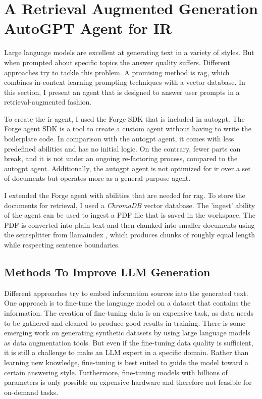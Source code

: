 \documentclass[../main.tex]{subfiles}
\begin{document}
\chapter{A Retrieval Augmented Generation AutoGPT Agent for IR}
\label{ch:agent}

Large language models are excellent at generating text in a variety of styles.
But when prompted about specific topics the answer quality suffers.
Different approaches try to tackle this problem.
A promising method is \gls{rag}, which combines in-context learning prompting techniques with a vector database.
In this section, I present an agent that is designed to answer user prompts in a retrieval-augmented fashion.

To create the \gls{ir} agent,
I used the Forge SDK \autocite{zotero-117} that is included in \gls{autogpt}.
The Forge agent SDK is a tool to create a custom agent without having to write the boilerplate code.
In comparison with the \gls{autogpt} agent, it comes with less predefined abilities and has no initial logic.
On the contrary, fewer parts can break, and it is not under an ongoing re-factoring process,
compared to the \gls{autogpt} agent.
Additionally, the \gls{autogpt} agent is not optimized for \gls{ir} over a set of documents
but operates more as a general-purpose agent.

I extended the Forge agent with abilities that are needed for \gls{rag}.
To store the documents for retrieval, I used a \emph{ChromaDB} vector database.
The 'ingest' ability of the agent can be used to ingest a PDF file that is saved in the workspace.
The PDF is converted into plain text and then chunked into smaller documents using the \gls{sentsplitter} from \gls{llamaindex} \cite{zotero-255},
which produces chunks of roughly equal length while respecting sentence boundaries.

\section{Methods To Improve LLM Generation}

Different approaches try to embed information sources into the generated text.
One approach is to fine-tune the language model on a dataset that contains the information.
The creation of fine-tuning data is an expensive task, as data needs to be gathered and cleaned to produce good results in training.
There is some emerging work on generating synthetic datasets by using large language models as data augmentation tools.
But even if the fine-tuning data quality is sufficient, it is still a challenge to make an LLM expert in a specific domain.
Rather than learning new knowledge, fine-tuning is best suited to guide the model toward a certain answering style.
Furthermore, fine-tuning models with billions of parameters is only possible on expensive hardware and therefore not feasible for on-demand tasks.
\end{document}
